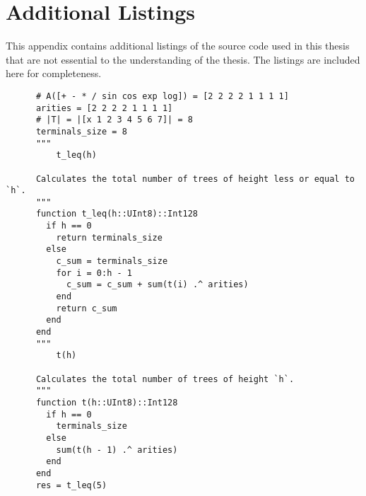 \chapter{Additional Listings}
\label{app:Listings}
  This appendix contains additional listings of the source code used in this
  thesis that are not essential to the understanding of the thesis.
  The listings are included here for completeness.
  
  \begin{src}
    \label{lst:cardinality_of_T_leq_5}
    \begin{verbatim}
      # A([+ - * / sin cos exp log]) = [2 2 2 2 1 1 1 1]
      arities = [2 2 2 2 1 1 1 1]
      # |T| = |[x 1 2 3 4 5 6 7]| = 8
      terminals_size = 8
      """
          t_leq(h)

      Calculates the total number of trees of height less or equal to `h`.
      """
      function t_leq(h::UInt8)::Int128
        if h == 0
          return terminals_size
        else
          c_sum = terminals_size
          for i = 0:h - 1
            c_sum = c_sum + sum(t(i) .^ arities)
          end
          return c_sum
        end
      end
      """
          t(h)

      Calculates the total number of trees of height `h`.
      """
      function t(h::UInt8)::Int128
        if h == 0
          terminals_size
        else
          sum(t(h - 1) .^ arities) 
        end
      end
      res = t_leq(5)
    \end{verbatim}
  \end{src}